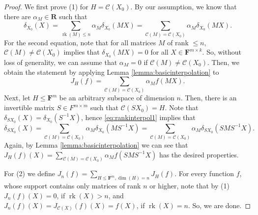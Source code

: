 \documentclass[11pt]{amsart}
\theoremstyle{plain}
\theoremstyle{definition}
\newcommand{\F}{{\mathbf F}}
\newcommand{\alg}[1]{\mathbf{#1}}
\newcommand{\algR}{\alg{R}}
\DeclareMathOperator{\rk}{rk}
\newcommand{\Col}[1]{\mathcal{C}(#1)}
\begin{document}
\begin{proof}
We first prove (1) for $H = \Col{X_0}$. By our assumption, we know that there are $\alpha_M \in \algR$ such that
\begin{equation} \label{eq:rankinterpol1} \delta_{X_0}(X) = \sum_{\rk(M)\leq n} \alpha_M \delta_{X_0}(MX) = \sum_{\Col{M}=\Col{X_0}} \alpha_M \delta_{X_0}(MX).
\end{equation}
For the second equation, note that for all matrices $M$ of rank $\leq n$, $\Col{M}\neq\Col{X_0}$ implies that $\delta_{X_0}(MX) = 0$ for all $X \in \F^{m\times k}$. So, without loss of generality, we can assume that $\alpha_M=0$ if $\Col{M}\neq\Col{X_0}$. Then, we obtain the statement by applying Lemma \ref{lemma:basicinterpolation} to  
\begin{equation} \label{eq:JHdefinition}
J_H(f) = \sum_{\Col{M}=\Col{X_0}} \alpha_M f(MX).
\end{equation}
Next, let $H \leq \F^{m}$ be an arbitrary subspace of dimension $n$. Then, there is an invertible matrix $S \in F^{m\times m}$ such that $\Col{SX_0} = H$. Note that $\delta_{SX_0}(X) = \delta_{X_0}(S^{-1}X)$, hence \eqref{eq:rankinterpol1} implies that 
$$\delta_{SX_0}(X) = \sum_{\Col{M}=\Col{X_0}} \alpha_M \delta_{X_0}(MS^{-1}X) = \sum_{\Col{M}=\Col{X_0}} \alpha_M \delta_{SX_0}(SMS^{-1}X).$$
Again, by Lemma \ref{lemma:basicinterpolation} we can see that $J_{H}(f)(X) = \sum_{\Col{M}=\Col{X_0}} \alpha_M f(SMS^{-1}X)$ has the desired properties.

For (2) we define $J_n(f) = \sum_{H \leq \F^m, \dim(H) = n} J_H(f)$. For every function $f$, whose support contains only matrices of rank $n$ or higher, note that by (1) $J_n(f)(X) = 0$, if $\rk(X) > n$, and $J_n(f)(X) = J_{\Col{X}}(f)(X) = f(X)$, if $\rk(X) = n$. So, we are done.
\end{proof}
\end{document}
